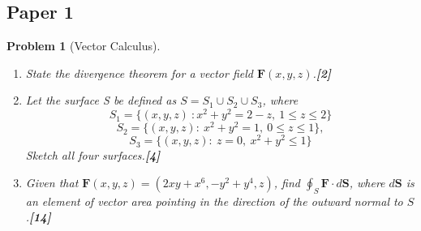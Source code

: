 \documentclass[a4paper]{article}
\theoremstyle{new}
\newtheorem{qns}{Problem}[section]
\begin{document}
\subsection{Paper 1}
\begin{qns}[Vector Calculus]\leavevmode
\begin{enumerate}[label=(\alph*)]
    \item State the divergence theorem for a vector field $\mathbf{F}(x, y, z)$.\hfill \textbf{[2]}
    \item Let the surface S be defined as $S=S_1\cup S_2\cup S_3$, where
$$S_1=\{(x,y,z)~:x^2+y^2=2-z,~1\leq z\leq 2\}$$
$$S_2 =\{(x, y, z) :~x^2 + y^2 = 1,~0\leq z\leq  1\},$$
$$S_3 =\{(x, y, z) :~z = 0,~x^2 + y^2\leq 1\}$$
Sketch all four surfaces.\hfill \textbf{[4]}
\item Given that $\mathbf{F}(x, y, z) = (2xy+x^6, −y^2+y^4, z)$, find $\oint_S\mathbf{F}\cdot d\mathbf{S}$, where $d\mathbf{S}$ is an element of vector area pointing in the direction of the outward normal to $S$.\hfill \textbf{[14]}
\end{enumerate}
\end{qns}
\end{document}
